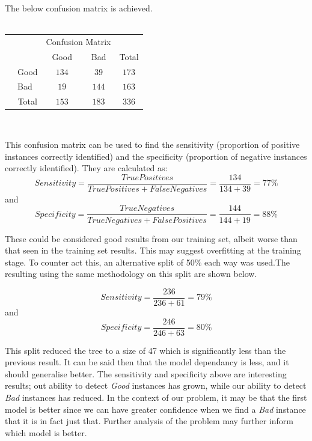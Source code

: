 \documentclass[paper=a4, fontsize=11pt]{scrartcl} %
\begin{document}
{\par \noindent The below confusion matrix is achieved. \\\\
\begin{tabular}{l|l|c|c|c}
\multicolumn{2}{c}{}&\multicolumn{2}{c}{Confusion Matrix}&\\
\cline{3-4}
\multicolumn{2}{c|}{}&Good&Bad&\multicolumn{1}{c}{Total}\\
\cline{2-4}
\multirow{2}{*}{}& Good & $134$ & $39$ & $173$\\
\cline{2-4}
& Bad & $19$ & $144$ & $163$\\
\cline{2-4}
\multicolumn{1}{c}{} & \multicolumn{1}{c}{Total} & \multicolumn{1}{c}{$153$} & \multicolumn{    1}{c}{$183$} & \multicolumn{1}{c}{$336$}\\
\end{tabular}\\
}
\par {This confusion matrix can be used to find the sensitivity (proportion of positive instances correctly identified) and the specificity (proportion of negative instances correctly identified). They are calculated as: 
\begin{equation}
Sensitivity =  \frac{True Positives }{True Positives + False Negatives} =\frac{134}{134 + 39} = 77\%
\end{equation}
{and}
\begin{equation}
Specificity =  \frac{True Negatives }{True Negatives + False Positives} =\frac{144}{144 + 19} = 88\%
\end{equation}
\clearpage
{\par These could be considered good results from our training set, albeit worse than that seen in the training set results. This may suggest overfitting at the training stage. To counter act this, an alternative split of 50\% each way was used.The resulting using the same methodology on this split are shown below. }
\begin{equation}
Sensitivity = \frac{236}{236 + 61} = 79\%
\end{equation}
{and}
\begin{equation}
Specificity =\frac{246}{246 + 63} = 80\%
\end{equation}}
{\par This split reduced the tree to a size of 47 which is significantly less than the previous result. It can be said then that the model dependancy is less, and it should generalise better. The sensitivity and specificity above are interesting results; out ability to detect {\it Good} instances has grown, while our ability to detect {\it Bad} instances has reduced. In the context of our problem, it may be that the first model is better since we can have greater confidence when we find a {\it Bad} instance that it is in fact just that. Further analysis of the problem may further inform which model is better.}\\\\
\end{document}
